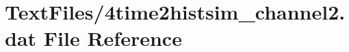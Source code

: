 \hypertarget{4time2histsim__channel2_8dat}{}\section{Text\+Files/4time2histsim\+\_\+channel2.dat File Reference}
\label{4time2histsim__channel2_8dat}
